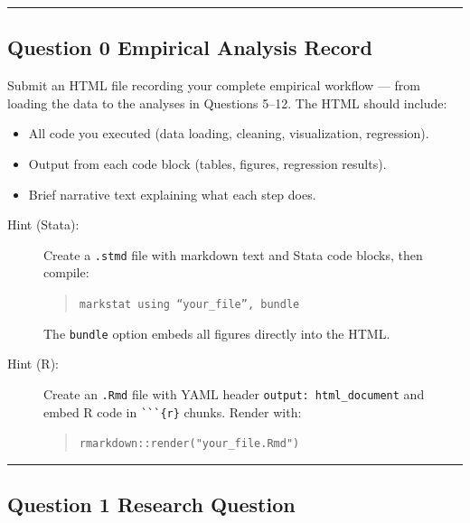 \documentclass[paper=a4, fontsize=11pt]{scrartcl}
\newcommand{\horrule}[1]{\rule{\linewidth}{#1}}
\begin{document}
\bigskip\horrule{0.4pt}\bigskip


\subsection*{Question 0 \quad Empirical Analysis Record}

Submit an HTML file recording your complete empirical workflow --- from loading the data to the analyses in Questions 5--12. The HTML should include:
\begin{itemize}
  \item All code you executed (data loading, cleaning, visualization, regression).
  \item Output from each code block (tables, figures, regression results).
  \item Brief narrative text explaining what each step does.
\end{itemize}

\begin{description}
  \item[Hint (Stata):] Create a \texttt{.stmd} file with markdown text and Stata code blocks, then compile:
    \begin{quote}\texttt{markstat using ``your\_file'', bundle}\end{quote}
    The \texttt{bundle} option embeds all figures directly into the HTML.
  \item[Hint (R):] Create an \texttt{.Rmd} file with YAML header \texttt{output: html\_document} and embed R code in \texttt{\`{}\`{}\`{}\{r\}} chunks. Render with:
    \begin{quote}\texttt{rmarkdown::render("your\_file.Rmd")}\end{quote}
\end{description}

\bigskip\horrule{0.4pt}\bigskip


\subsection*{Question 1 \quad Research Question}
\end{document}

